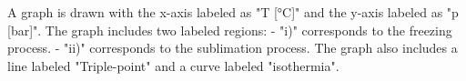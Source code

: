 A graph is drawn with the x-axis labeled as "T [°C]" and the y-axis labeled as "p [bar]". The graph includes two labeled regions:  
- "i)" corresponds to the freezing process.  
- "ii)" corresponds to the sublimation process.  
The graph also includes a line labeled "Triple-point" and a curve labeled "isothermia".